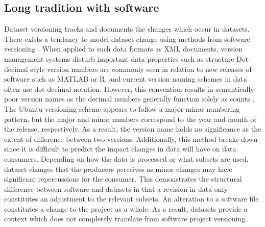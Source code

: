 \subsection{Long tradition with software}
Dataset versioning tracks and documents the changes which occur in datasets.
There exists a tendancy to model dataset change using methods from software versioning \cite{Chacon:2009:PG:1618548} \cite{cederqvist2002version} \cite{tichy1985rcs}.
When applied to such data formats as XML documents, version management systems disturb important data properties such as structure \cite{Chien:2000:VMX:646544.696357}
Dot-decimal style version numbers are commonly seen in relation to new releases of software such as MATLAB or R, and current version naming schemes in data often use dot-decimal notation.
However, this convention results in semantically poor version names as the decimal numbers generally function solely as counts \cite{Dijkstra1994}.
The Ubuntu versioning scheme appears to follow a major-minor numbering pattern, but the major and minor numbers correspond to the year and month of the release, respectively.
As a result, the version name holds no significance as the extent of difference between two versions.
Additionally, this method breaks down since it is difficult to predict the impact changes in data will have on data consumers.
Depending on how the data is processed or what subsets are used, dataset changes that the producers perceives as minor changes may have significant repercussions for the consumer.
This demonstrates the structural difference between software and datasets in that a revision in data only constitutes an adjustment to the relevant subsets.
An alteration to a software file constitutes a change to the project as a whole.
As a result, datasets provide a context which does not completely translate from software project versioning.

